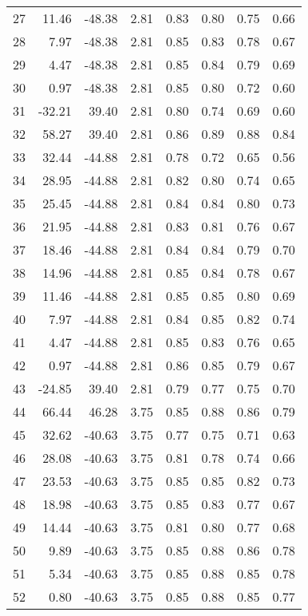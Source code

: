 \begin{center}
\begin{longtable}{crrccccc}
27 & 11.46 & -48.38 &  2.81 &  0.83 &  0.80 &  0.75 &  0.66\\
28 &  7.97 & -48.38 &  2.81 &  0.85 &  0.83 &  0.78 &  0.67\\
29 &  4.47 & -48.38 &  2.81 &  0.85 &  0.84 &  0.79 &  0.69\\
30 &  0.97 & -48.38 &  2.81 &  0.85 &  0.80 &  0.72 &  0.60\\
31 & -32.21 & 39.40 &  2.81 &  0.80 &  0.74 &  0.69 &  0.60\\
32 & 58.27 & 39.40 &  2.81 &  0.86 &  0.89 &  0.88 &  0.84\\
33 & 32.44 & -44.88 &  2.81 &  0.78 &  0.72 &  0.65 &  0.56\\
34 & 28.95 & -44.88 &  2.81 &  0.82 &  0.80 &  0.74 &  0.65\\
35 & 25.45 & -44.88 &  2.81 &  0.84 &  0.84 &  0.80 &  0.73\\
36 & 21.95 & -44.88 &  2.81 &  0.83 &  0.81 &  0.76 &  0.67\\
37 & 18.46 & -44.88 &  2.81 &  0.84 &  0.84 &  0.79 &  0.70\\
38 & 14.96 & -44.88 &  2.81 &  0.85 &  0.84 &  0.78 &  0.67\\
39 & 11.46 & -44.88 &  2.81 &  0.85 &  0.85 &  0.80 &  0.69\\
40 &  7.97 & -44.88 &  2.81 &  0.84 &  0.85 &  0.82 &  0.74\\
41 &  4.47 & -44.88 &  2.81 &  0.85 &  0.83 &  0.76 &  0.65\\
42 &  0.97 & -44.88 &  2.81 &  0.86 &  0.85 &  0.79 &  0.67\\
43 & -24.85 & 39.40 &  2.81 &  0.79 &  0.77 &  0.75 &  0.70\\
44 & 66.44 & 46.28 &  3.75 &  0.85 &  0.88 &  0.86 &  0.79\\
45 & 32.62 & -40.63 &  3.75 &  0.77 &  0.75 &  0.71 &  0.63\\
46 & 28.08 & -40.63 &  3.75 &  0.81 &  0.78 &  0.74 &  0.66\\
47 & 23.53 & -40.63 &  3.75 &  0.85 &  0.85 &  0.82 &  0.73\\
48 & 18.98 & -40.63 &  3.75 &  0.85 &  0.83 &  0.77 &  0.67\\
49 & 14.44 & -40.63 &  3.75 &  0.81 &  0.80 &  0.77 &  0.68\\
50 &  9.89 & -40.63 &  3.75 &  0.85 &  0.88 &  0.86 &  0.78\\
51 &  5.34 & -40.63 &  3.75 &  0.85 &  0.88 &  0.85 &  0.78\\
52 &  0.80 & -40.63 &  3.75 &  0.85 &  0.88 &  0.85 &  0.77\\

\end{longtable}
\end{center}
